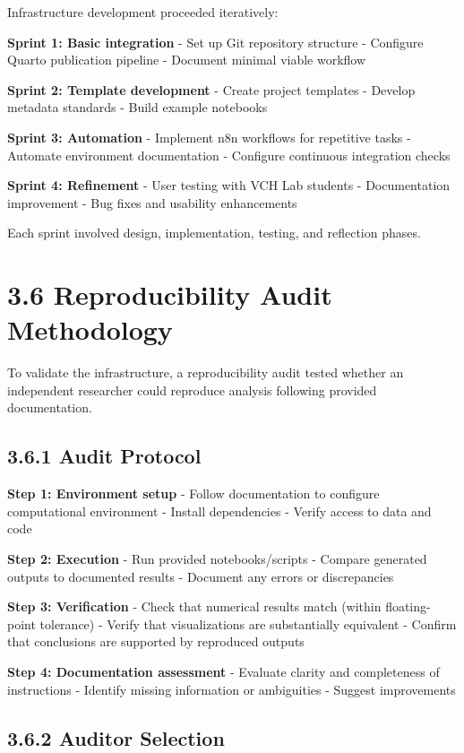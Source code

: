 \documentclass[
  oneside,
  open=any]{scrbook}
\begin{document}
Infrastructure development proceeded iteratively:

\textbf{Sprint 1: Basic integration} - Set up Git repository structure -
Configure Quarto publication pipeline - Document minimal viable workflow

\textbf{Sprint 2: Template development} - Create project templates -
Develop metadata standards - Build example notebooks

\textbf{Sprint 3: Automation} - Implement n8n workflows for repetitive
tasks - Automate environment documentation - Configure continuous
integration checks

\textbf{Sprint 4: Refinement} - User testing with VCH Lab students -
Documentation improvement - Bug fixes and usability enhancements

Each sprint involved design, implementation, testing, and reflection
phases.

\section{3.6 Reproducibility Audit
Methodology}\label{reproducibility-audit-methodology}

To validate the infrastructure, a reproducibility audit tested whether
an independent researcher could reproduce analysis following provided
documentation.

\subsection{3.6.1 Audit Protocol}\label{audit-protocol}

\textbf{Step 1: Environment setup} - Follow documentation to configure
computational environment - Install dependencies - Verify access to data
and code

\textbf{Step 2: Execution} - Run provided notebooks/scripts - Compare
generated outputs to documented results - Document any errors or
discrepancies

\textbf{Step 3: Verification} - Check that numerical results match
(within floating-point tolerance) - Verify that visualizations are
substantially equivalent - Confirm that conclusions are supported by
reproduced outputs

\textbf{Step 4: Documentation assessment} - Evaluate clarity and
completeness of instructions - Identify missing information or
ambiguities - Suggest improvements

\subsection{3.6.2 Auditor Selection}\label{auditor-selection}
\end{document}
